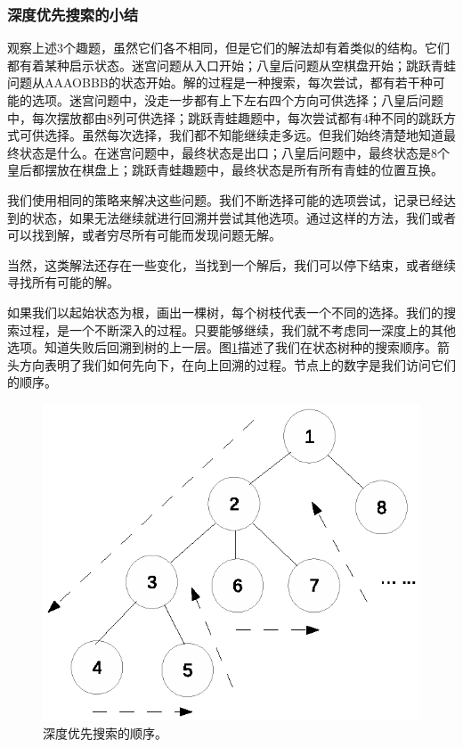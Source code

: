 \documentclass[UTF8]{article}
\begin{document}
\subsubsection{深度优先搜索的小结}

观察上述3个趣题，虽然它们各不相同，但是它们的解法却有着类似的结构。它们都有着某种启示状态。迷宫问题从入口开始；八皇后问题从空棋盘开始；跳跃青蛙问题从AAAOBBB的状态开始。解的过程是一种搜索，每次尝试，都有若干种可能的选项。迷宫问题中，没走一步都有上下左右四个方向可供选择；八皇后问题中，每次摆放都由8列可供选择；跳跃青蛙趣题中，每次尝试都有4种不同的跳跃方式可供选择。虽然每次选择，我们都不知能继续走多远。但我们始终清楚地知道最终状态是什么。在迷宫问题中，最终状态是出口；八皇后问题中，最终状态是8个皇后都摆放在棋盘上；跳跃青蛙趣题中，最终状态是所有所有青蛙的位置互换。

我们使用相同的策略来解决这些问题。我们不断选择可能的选项尝试，记录已经达到的状态，如果无法继续就进行回溯并尝试其他选项。通过这样的方法，我们或者可以找到解，或者穷尽所有可能而发现问题无解。

当然，这类解法还存在一些变化，当找到一个解后，我们可以停下结束，或者继续寻找所有可能的解。

如果我们以起始状态为根，画出一棵树，每个树枝代表一个不同的选择。我们的搜索过程，是一个不断深入的过程。只要能够继续，我们就不考虑同一深度上的其他选项。知道失败后回溯到树的上一层。图\ref{fig:dfs-tree}描述了我们在状态树种的搜索顺序。箭头方向表明了我们如何先向下，在向上回溯的过程。节点上的数字是我们访问它们的顺序。

\begin{figure}[htbp]
 \centering
 \includegraphics[scale=0.6]{img/dfs-tree.eps}
 \caption{深度优先搜索的顺序。}
 \label{fig:dfs-tree}
\end{figure}
\end{document}

